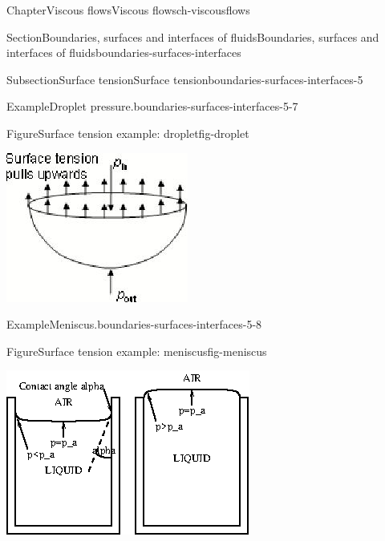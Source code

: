 \documentclass[oneside,10pt,]{book}
\numberwithin{equation}{section}
\begin{document}
\begin{chapterptx}{Chapter}{Viscous flows}{}{Viscous flows}{}{}{ch-viscousflows}
\begin{sectionptx}{Section}{Boundaries, surfaces and interfaces of fluids}{}{Boundaries, surfaces and interfaces of fluids}{}{}{boundaries-surfaces-interfaces}
\begin{subsectionptx}{Subsection}{Surface tension}{}{Surface tension}{}{}{boundaries-surfaces-interfaces-5}
\begin{example}{Example}{Droplet pressure.}{boundaries-surfaces-interfaces-5-7}
\begin{figureptx}{Figure}{Surface tension example: droplet}{fig-droplet}{}
\begin{image}{0.25}{0.5}{0.25}{}
\includegraphics[width=\linewidth]{external/ch-chapter07-droplet.jpg}
\end{image}%
\tcblower
\end{figureptx}%
\end{example}
\begin{example}{Example}{Meniscus.}{boundaries-surfaces-interfaces-5-8}%
\begin{figureptx}{Figure}{Surface tension example: meniscus}{fig-meniscus}{}%
\begin{image}{0.25}{0.5}{0.25}{}%
\includegraphics[width=\linewidth]{external/ch-chapter07-meniscus.png}
\end{image}%
\tcblower
\end{figureptx}%

\end{example}
\end{subsectionptx}
\end{sectionptx}
\end{chapterptx}
\end{document}
